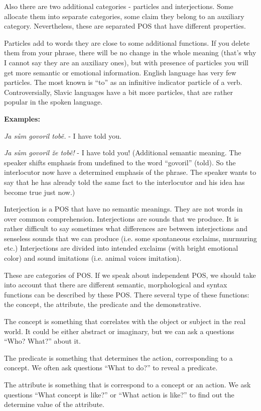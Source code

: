 Also there are two additional categories - particles and interjections. Some allocate them into separate categories, some claim they belong to an auxiliary category. Nevertheless, these are separated POS that have different properties.

Particles add to words they are close to some additional functions. If you delete them from your phrase, there will be no change in the whole meaning (that’s why I cannot say they are an auxiliary ones), but with presence of particles you will get more semantic or emotional information. English language has very few particles. The most known is “to” as an infinitive indicator particle of a verb. Controversially, Slavic languages have a bit more particles, that are rather popular in the spoken language. 

\textbf{Examples:}

\textit{Ja sům govoril tobě. }- I have told you.

\textit{Ja sům govoril že tobě!} - I have told you! (Additional semantic meaning. The speaker shifts emphasis from undefined to the word “govoril” (told). So the interlocutor now have a determined emphasis of the phrase. The speaker wants to say that he has already told the same fact to the interlocutor and his idea has become true just now.) 

Interjection is a POS that have no semantic meanings. They are not words in over common comprehension. Interjections are sounds that we produce. It is rather difficult to say sometimes what differences are between interjections and senseless sounds that we can produce (i.e. some spontaneous exclaims, murmuring etc.) Interjections are divided into intended exclaims (with bright emotional color) and sound imitations (i.e. animal voices imitation).

These are categories of POS. If we speak about independent POS, we should take into account that there are different semantic, morphological and syntax functions can be described by these POS. There several type of these functions: the concept, the attribute, the predicate and the demonstrative.

The concept is something that correlates with the object or subject in the real world. It could be either abstract or imaginary, but we can ask a questions “Who? What?” about it.

The predicate is something that determines the action, corresponding to a concept. We often ask questions “What to do?” to reveal a predicate.

The attribute is something that is correspond to a concept or an action. We ask questions “What concept is like?” or “What action is like?” to find out the determine value of the attribute.

